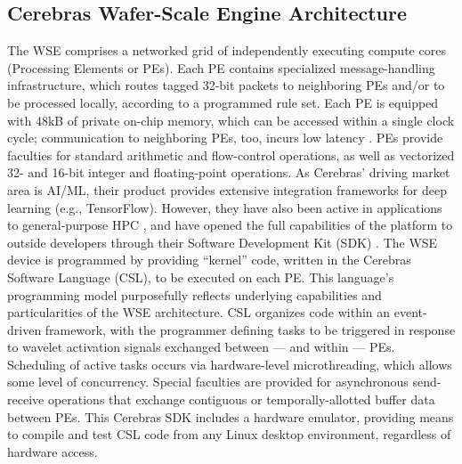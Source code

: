 \subsection{Cerebras Wafer-Scale Engine Architecture}

The WSE comprises a networked grid of independently executing compute cores (Processing Elements or PEs).
Each PE contains specialized message-handling infrastructure, which routes tagged 32-bit packets to neighboring PEs and/or to be processed locally, according to a programmed rule set.
Each PE is equipped with 48kB of private on-chip memory, which can be accessed within a single clock cycle;
communication to neighboring PEs, too, incurs low latency \cite{buitrago2021neocortex}.
PEs provide faculties for standard arithmetic and flow-control operations, as well as vectorized 32- and 16-bit integer and floating-point operations.
As Cerebras' driving market area is AI/ML, their product provides extensive integration frameworks for deep learning (e.g., TensorFlow).
However, they have also been active in applications to general-purpose HPC \cite{jacquelin2022scalable,rocki2020fast}, and have opened the full capabilities of the platform to outside developers through their Software Development Kit (SDK) \cite{selig2022cerebras}.
The WSE device is programmed by providing ``kernel'' code, written in the Cerebras Software Language (CSL), to be executed on each PE.
This language's programming model purposefully reflects underlying capabilities and particularities of the WSE architecture.
CSL organizes code within an event-driven framework, with the programmer defining tasks to be triggered in response to wavelet activation signals exchanged between --- and within --- PEs.
Scheduling of active tasks occurs via hardware-level microthreading, which allows some level of concurrency.
Special faculties are provided for asynchronous send-receive operations that exchange contiguous or temporally-allotted buffer data between PEs.
This Cerebras SDK includes a hardware emulator, providing means to compile and test CSL code from any Linux desktop environment, regardless of hardware access.
